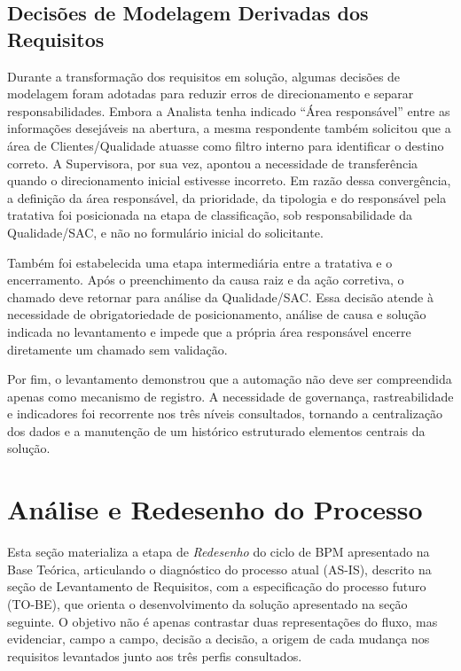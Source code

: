 \subsection{Decisões de Modelagem Derivadas dos Requisitos}

Durante a transformação dos requisitos em solução, algumas
decisões de modelagem foram adotadas para reduzir erros de
direcionamento e separar responsabilidades. Embora a
Analista tenha indicado ``Área responsável'' entre as
informações desejáveis na abertura, a mesma respondente
também solicitou que a área de Clientes/Qualidade atuasse
como filtro interno para identificar o destino correto.
A Supervisora, por sua vez, apontou a necessidade de
transferência quando o direcionamento inicial estivesse
incorreto. Em razão dessa convergência, a definição da área
responsável, da prioridade, da tipologia e do responsável
pela tratativa foi posicionada na etapa de classificação,
sob responsabilidade da Qualidade/SAC, e não no formulário
inicial do solicitante.

Também foi estabelecida uma etapa intermediária entre a
tratativa e o encerramento. Após o preenchimento da causa
raiz e da ação corretiva, o chamado deve retornar para
análise da Qualidade/SAC. Essa decisão atende à necessidade
de obrigatoriedade de posicionamento, análise de causa e
solução indicada no levantamento e impede que a própria área
responsável encerre diretamente um chamado sem validação.

Por fim, o levantamento demonstrou que a automação não deve
ser compreendida apenas como mecanismo de registro. A
necessidade de governança, rastreabilidade e indicadores
foi recorrente nos três níveis consultados, tornando a
centralização dos dados e a manutenção de um histórico
estruturado elementos centrais da solução.

\section{Análise e Redesenho do Processo}

Esta seção materializa a etapa de \textit{Redesenho} do ciclo
de BPM apresentado na Base Teórica, articulando o diagnóstico
do processo atual (AS-IS), descrito na seção de Levantamento
de Requisitos, com a especificação do processo futuro
(TO-BE), que orienta o desenvolvimento da solução apresentado
na seção seguinte. O objetivo não é apenas contrastar duas
representações do fluxo, mas evidenciar, campo a campo,
decisão a decisão, a origem de cada mudança nos requisitos
levantados junto aos três perfis consultados.

